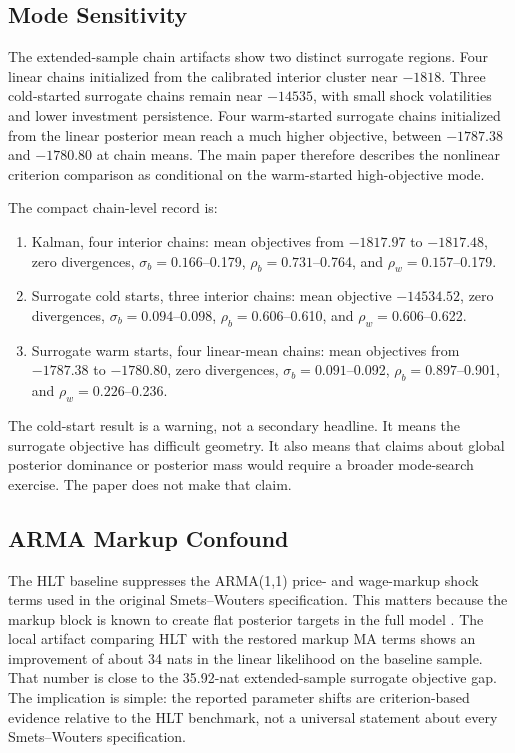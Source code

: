 \documentclass[12pt]{article}
\begin{document}
\subsection{Mode Sensitivity}
\label{apptech:mode_sensitivity}

The extended-sample chain artifacts show two distinct surrogate regions. Four
linear chains initialized from the calibrated interior cluster near
\(-1818\). Three cold-started surrogate chains remain near \(-14535\), with
small shock volatilities and lower investment persistence. Four warm-started
surrogate chains initialized from the linear posterior mean reach a much higher
objective, between \(-1787.38\) and \(-1780.80\) at chain means. The main paper
therefore describes the nonlinear criterion comparison as conditional on the
warm-started high-objective mode.

The compact chain-level record is:
\begin{enumerate}[leftmargin=2em,itemsep=0.15em]
\item Kalman, four interior chains: mean objectives from \(-1817.97\) to
      \(-1817.48\), zero divergences, \(\sigma_b=0.166\)--0.179,
      \(\rho_b=0.731\)--0.764, and \(\rho_w=0.157\)--0.179.
\item Surrogate cold starts, three interior chains: mean objective
      \(-14534.52\), zero divergences, \(\sigma_b=0.094\)--0.098,
      \(\rho_b=0.606\)--0.610, and \(\rho_w=0.606\)--0.622.
\item Surrogate warm starts, four linear-mean chains: mean objectives from
      \(-1787.38\) to \(-1780.80\), zero divergences,
      \(\sigma_b=0.091\)--0.092, \(\rho_b=0.897\)--0.901, and
      \(\rho_w=0.226\)--0.236.
\end{enumerate}

The cold-start result is a warning, not a secondary headline. It means the
surrogate objective has difficult geometry. It also means that claims about
global posterior dominance or posterior mass would require a broader
mode-search exercise. The paper does not make that claim.

\subsection{ARMA Markup Confound}
\label{apptech:arma_confound}

The HLT baseline suppresses the ARMA(1,1) price- and wage-markup shock terms
used in the original Smets--Wouters specification. This matters because the
markup block is known to create flat posterior targets in the full model
\citep{farkas2020bayesian}. The local artifact comparing HLT with the restored
markup MA terms shows an improvement of about 34 nats in the linear likelihood
on the baseline sample. That number is close to the 35.92-nat extended-sample
surrogate objective gap. The implication is simple: the reported parameter
shifts are criterion-based evidence relative to the HLT benchmark, not a
universal statement about every Smets--Wouters specification.
\end{document}
